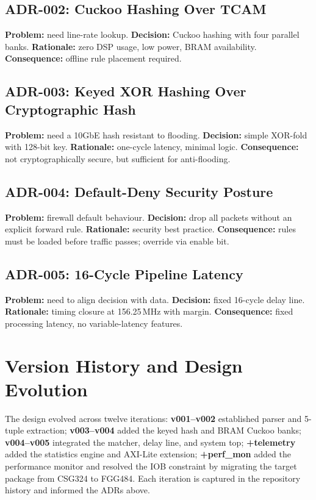 \documentclass[12pt,twoside,openright]{book}
\begin{document}
\subsection{ADR-002: Cuckoo Hashing Over TCAM}
\textbf{Problem:} need line-rate lookup. \textbf{Decision:} Cuckoo hashing with four parallel banks.
\textbf{Rationale:} zero DSP usage, low power, BRAM availability. \textbf{Consequence:} offline rule
placement required.

\subsection{ADR-003: Keyed XOR Hashing Over Cryptographic Hash}
\textbf{Problem:} need a 10GbE hash resistant to flooding. \textbf{Decision:} simple XOR-fold with
128-bit key. \textbf{Rationale:} one-cycle latency, minimal logic. \textbf{Consequence:} not
cryptographically secure, but sufficient for anti-flooding.

\subsection{ADR-004: Default-Deny Security Posture}
\textbf{Problem:} firewall default behaviour. \textbf{Decision:} drop all packets without an
explicit forward rule. \textbf{Rationale:} security best practice. \textbf{Consequence:} rules must
be loaded before traffic passes; override via enable bit.

\subsection{ADR-005: 16-Cycle Pipeline Latency}
\textbf{Problem:} need to align decision with data. \textbf{Decision:} fixed 16-cycle delay line.
\textbf{Rationale:} timing closure at 156.25\,MHz with margin. \textbf{Consequence:} fixed
processing latency, no variable-latency features.

\section{Version History and Design Evolution}

The design evolved across twelve iterations: \textbf{v001--v002} established parser and 5-tuple
extraction; \textbf{v003--v004} added the keyed hash and BRAM Cuckoo banks; \textbf{v004--v005}
integrated the matcher, delay line, and system top; \textbf{+telemetry} added the statistics engine
and AXI-Lite extension; \textbf{+perf\_mon} added the performance monitor and resolved the IOB
constraint by migrating the target package from CSG324 to FGG484. Each iteration is captured in the
repository history and informed the ADRs above.
\end{document}

